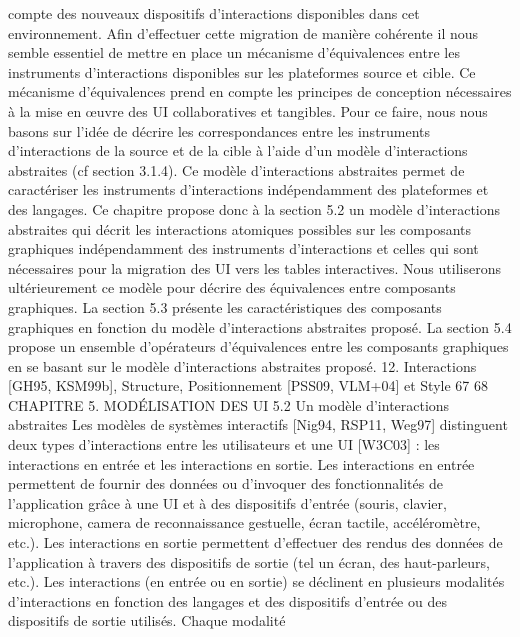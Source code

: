 \documentclass{article}
\begin{document}
compte des nouveaux dispositifs d’interactions disponibles dans cet environnement. Aﬁn d’effectuer cette migration de mani\`{e}re coh\'{e}rente il nous semble essentiel de mettre en place un m\'{e}canisme
d’\'{e}quivalences entre les instruments d’interactions disponibles sur les plateformes source et cible.
Ce m\'{e}canisme d’\'{e}quivalences prend en compte les principes de conception n\'{e}cessaires \`{a} la mise en
œuvre des UI collaboratives et tangibles. Pour ce faire, nous nous basons sur l’id\'{e}e de d\'{e}crire les
correspondances entre les instruments d’interactions de la source et de la cible \`{a} l’aide d’un mod\`{e}le
d’interactions abstraites (cf section 3.1.4). Ce mod\`{e}le d’interactions abstraites permet de caract\'{e}riser
les instruments d’interactions ind\'{e}pendamment des plateformes et des langages.
Ce chapitre propose donc \`{a} la section 5.2 un mod\`{e}le d’interactions abstraites qui d\'{e}crit les interactions atomiques possibles sur les composants graphiques ind\'{e}pendamment des instruments d’interactions et celles qui sont n\'{e}cessaires pour la migration des UI vers les tables interactives. Nous
utiliserons ult\'{e}rieurement ce mod\`{e}le pour d\'{e}crire des \'{e}quivalences entre composants graphiques. La
section 5.3 pr\'{e}sente les caract\'{e}ristiques des composants graphiques en fonction du mod\`{e}le d’interactions abstraites propos\'{e}. La section 5.4 propose un ensemble d’op\'{e}rateurs d’\'{e}quivalences entre les
composants graphiques en se basant sur le mod\`{e}le d’interactions abstraites propos\'{e}.
12. Interactions [GH95, KSM99b], Structure, Positionnement [PSS09, VLM+04] et Style
67
68
CHAPITRE 5. MODÉLISATION DES UI
5.2
Un mod\`{e}le d’interactions abstraites
Les mod\`{e}les de syst\`{e}mes interactifs [Nig94, RSP11, Weg97] distinguent deux types d’interactions
entre les utilisateurs et une UI [W3C03] : les interactions en entr\'{e}e et les interactions en sortie. Les
interactions en entr\'{e}e permettent de fournir des donn\'{e}es ou d’invoquer des fonctionnalit\'{e}s de l’application gr\^{a}ce \`{a} une UI et \`{a} des dispositifs d’entr\'{e}e (souris, clavier, microphone, camera de reconnaissance gestuelle, \'{e}cran tactile, acc\'{e}l\'{e}rom\`{e}tre, etc.). Les interactions en sortie permettent d’effectuer des
rendus des donn\'{e}es de l’application \`{a} travers des dispositifs de sortie (tel un \'{e}cran, des haut-parleurs,
etc.). Les interactions (en entr\'{e}e ou en sortie) se d\'{e}clinent en plusieurs modalit\'{e}s d’interactions en
fonction des langages et des dispositifs d’entr\'{e}e ou des dispositifs de sortie utilis\'{e}s. Chaque modalit\'{e}
\end{document}
